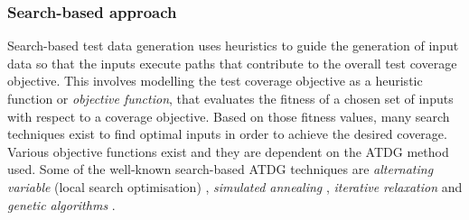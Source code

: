 
\subsubsection{Search-based approach}

Search-based test data generation uses heuristics to guide the generation of input data so that the inputs execute paths that contribute to the overall test coverage objective. This involves modelling the test coverage objective as a heuristic function or \emph{objective function}, that evaluates the fitness of a chosen set of inputs with respect to a coverage objective. Based on those fitness values, many search techniques exist to find optimal inputs in order to achieve the desired coverage. Various objective functions exist and they are dependent on the ATDG method used. Some of the well-known search-based ATDG techniques are \emph{alternating variable} (local search optimisation) \cite{korel1990automated, gallagher1997adtest}, \emph{simulated annealing} \cite{tracey1998automated,tracey1998way}, \emph{iterative relaxation} \cite{gupta1998automated} and \emph{genetic algorithms} \cite{michael1998automated,michael2001generating}.
 
